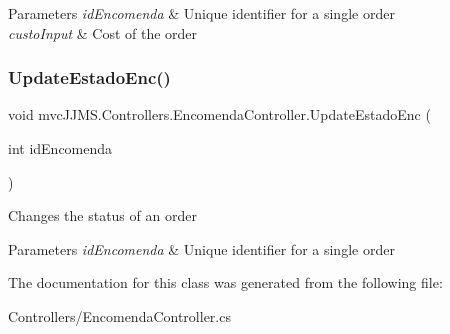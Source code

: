 \begin{DoxyParams}{Parameters}
{\em id\+Encomenda} & Unique identifier for a single order\\
\hline
{\em custo\+Input} & Cost of the order\\
\hline
\end{DoxyParams}
\mbox{\label{classmvc_j_j_m_s_1_1_controllers_1_1_encomenda_controller_a36abeee72b22518276b9af3d4b7ed48f}} 
\subsubsection{\texorpdfstring{Update\+Estado\+Enc()}{UpdateEstadoEnc()}}
{\footnotesize\ttfamily void mvc\+J\+J\+M\+S.\+Controllers.\+Encomenda\+Controller.\+Update\+Estado\+Enc (\begin{DoxyParamCaption}\item[{int}]{id\+Encomenda }\end{DoxyParamCaption})\hspace{0.3cm}{\ttfamily [inline]}}



Changes the status of an order 


\begin{DoxyParams}{Parameters}
{\em id\+Encomenda} & Unique identifier for a single order\\
\hline
\end{DoxyParams}


The documentation for this class was generated from the following file\+:\begin{DoxyCompactItemize}
\item 
Controllers/Encomenda\+Controller.\+cs\end{DoxyCompactItemize}
